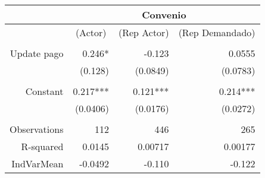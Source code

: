 \begin{tabular}{rrrr}
\toprule
      & \multicolumn{3}{c}{Convenio} \\
\midrule
      & \multicolumn{1}{c}{(Actor)} & \multicolumn{1}{c}{(Rep Actor)} & \multicolumn{1}{c}{(Rep Demandado)} \\
      & \multicolumn{1}{c}{} & \multicolumn{1}{c}{} & \multicolumn{1}{c}{} \\
Update pago & 0.246* & -0.123 & 0.0555 \\
      & (0.128) & (0.0849) & (0.0783) \\
      &       &       &  \\
Constant  & 0.217*** & 0.121*** & 0.214*** \\
      & (0.0406) & (0.0176) & (0.0272) \\
      &       &       &  \\
Observations & 112   & 446   & 265 \\
R-squared & 0.0145 & 0.00717 & 0.00177 \\
IndVarMean & -0.0492 & -0.110 & -0.122 \\
\bottomrule
\end{tabular}%
